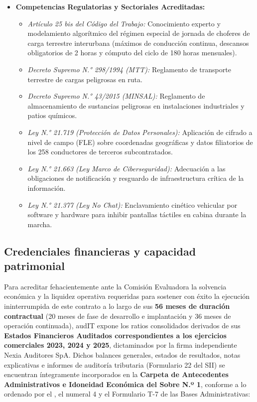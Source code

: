 \begin{itemize}
\begin{itemize}
  \end{itemize}
  \item \textbf{Competencias Regulatorias y Sectoriales Acreditadas:}
  \begin{itemize}
    \item \textit{Artículo 25 bis del Código del Trabajo:} Conocimiento experto y modelamiento algorítmico del régimen especial de jornada de choferes de carga terrestre interurbana (máximos de conducción continua, descansos obligatorios de 2 horas y cómputo del ciclo de 180 horas mensuales).
    \item \textit{Decreto Supremo N.° 298/1994 (MTT):} Reglamento de transporte terrestre de cargas peligrosas en ruta.
    \item \textit{Decreto Supremo N.° 43/2015 (MINSAL):} Reglamento de almacenamiento de sustancias peligrosas en instalaciones industriales y patios químicos.
    \item \textit{Ley N.° 21.719 (Protección de Datos Personales):} Aplicación de cifrado a nivel de campo (FLE) sobre coordenadas geográficas y datos filiatorios de los 258 conductores de terceros subcontratados.
    \item \textit{Ley N.° 21.663 (Ley Marco de Ciberseguridad):} Adecuación a las obligaciones de notificación y resguardo de infraestructura crítica de la información.
    \item \textit{Ley N.° 21.377 (Ley No Chat):} Enclavamiento cinético vehicular por software y hardware para inhibir pantallas táctiles en cabina durante la marcha.
  \end{itemize}
\end{itemize}

\subsection{Credenciales financieras y capacidad patrimonial}\label{sec:1-financiero}

Para acreditar fehacientemente ante la Comisión Evaluadora la solvencia económica y la liquidez operativa requeridas para sostener con éxito la ejecución ininterrumpida de este contrato a lo largo de sus \textbf{56 meses de duración contractual} (20 meses de fase de desarrollo e implantación y 36 meses de operación continuada), audIT expone los ratios consolidados derivados de sus \textbf{Estados Financieros Auditados correspondientes a los ejercicios comerciales 2023, 2024 y 2025}, dictaminados por la firma independiente Nexia Auditores SpA. Dichos balances generales, estados de resultados, notas explicativas e informes de auditoría tributaria (Formulario 22 del SII) se encuentran íntegramente incorporados en la \textbf{Carpeta de Antecedentes Administrativos e Idoneidad Económica del Sobre N.º 1}, conforme a lo ordenado por el , el  numeral 4 y el Formulario T-7 de las Bases Administrativas:

